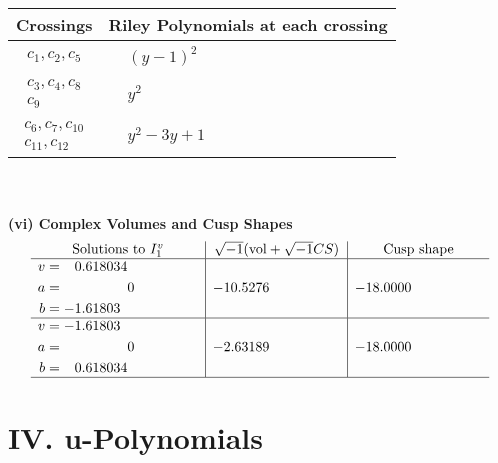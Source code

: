 \documentclass[1p]{elsarticle_modified}
\theoremstyle{definition}
\newcommand{\I}{\sqrt{-1}}
\begin{document}
\begin{tabular}{m{50pt}|m{274pt}}
Crossings & \hspace{64pt}Riley Polynomials at each crossing \\
\hline $$\begin{aligned}c_{1},c_{2},c_{5}\end{aligned}$$&$\begin{aligned}
&(y-1)^2
\end{aligned}$\\
\hline $$\begin{aligned}c_{3},c_{4},c_{8}\\c_{9}\end{aligned}$$&$\begin{aligned}
&y^2
\end{aligned}$\\
\hline $$\begin{aligned}c_{6},c_{7},c_{10}\\c_{11},c_{12}\end{aligned}$$&$\begin{aligned}
&y^2-3 y+1
\end{aligned}$\\
\hline
\end{tabular}\\~\\
\newpage\flushleft \textbf{(vi) Complex Volumes and Cusp Shapes}
$$\begin{array}{c|c|c}  
\text{Solutions to }I^v_{1}& \I (\text{vol} + \sqrt{-1}CS) & \text{Cusp shape}\\
 \hline 
\begin{aligned}
v &= \phantom{-}0.618034\phantom{ +0.000000I} \\
a &= \phantom{-0.000000 } 0 \\
b &= -1.61803\phantom{ +0.000000I}\end{aligned}
 & -10.5276\phantom{ +0.000000I} & -18.0000\phantom{ +0.000000I} \\ \hline\begin{aligned}
v &= -1.61803\phantom{ +0.000000I} \\
a &= \phantom{-0.000000 } 0 \\
b &= \phantom{-}0.618034\phantom{ +0.000000I}\end{aligned}
 & -2.63189\phantom{ +0.000000I} & -18.0000\phantom{ +0.000000I}\\
 \hline 
 \end{array}$$\newpage
\newpage\renewcommand{\arraystretch}{1}
\centering \section*{ IV. u-Polynomials}
\end{document}
